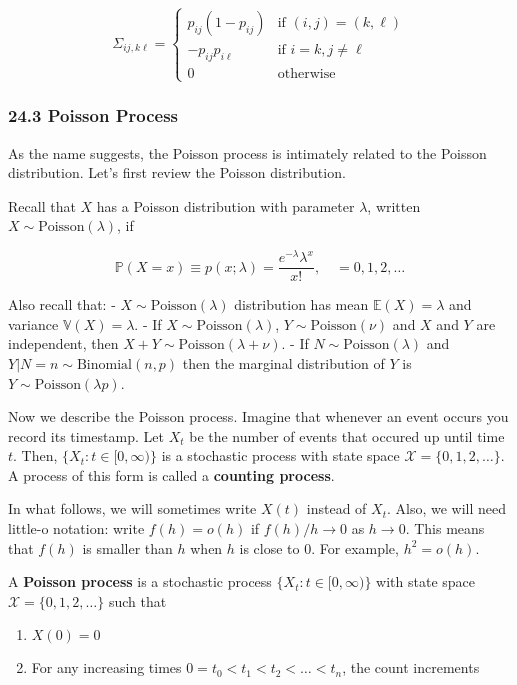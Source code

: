 \[ 
\Sigma_{ij, k\ell} = \begin{cases}
p_{ij}(1 - p_{ij}) &\text{if } (i, j) = (k, \ell) \\
-p_{ij} p_{i\ell} &\text{if } i = k, j \neq \ell \\
0 &\text{otherwise}
\end{cases}
\]

\subsubsection{24.3 Poisson Process}\label{poisson-process}

As the name suggests, the Poisson process is intimately related to the
Poisson distribution. Let's first review the Poisson distribution.

Recall that \(X\) has a Poisson distribution with parameter \(\lambda\),
written \(X \sim \text{Poisson}(\lambda)\), if

\[ \mathbb{P}(X = x) \equiv p(x; \lambda) = \frac{e^{-\lambda} \lambda^x}{x!}, \quad = 0, 1, 2, \dots \]

Also recall that: - \(X \sim \text{Poisson}(\lambda)\) distribution has
mean \(\mathbb{E}(X) = \lambda\) and variance
\(\mathbb{V}(X) = \lambda\). - If \(X \sim \text{Poisson}(\lambda)\),
\(Y \sim \text{Poisson}(\nu)\) and \(X\) and \(Y\) are independent, then
\(X + Y \sim \text{Poisson}(\lambda + \nu)\). - If
\(N \sim \text{Poisson}(\lambda)\) and
\(Y | N = n \sim \text{Binomial}(n, p)\) then the marginal distribution
of \(Y\) is \(Y \sim \text{Poisson}(\lambda p)\).

Now we describe the Poisson process. Imagine that whenever an event
occurs you record its timestamp. Let \(X_t\) be the number of events
that occured up until time \(t\). Then,
\(\{ X_t : t \in [0, \infty) \}\) is a stochastic process with state
space \(\mathcal{X} = \{ 0, 1, 2, \dots \}\). A process of this form is
called a \textbf{counting process}.

In what follows, we will sometimes write \(X(t)\) instead of \(X_t\).
Also, we will need little-o notation: write \(f(h) = o(h)\) if
\(f(h) / h \rightarrow 0\) as \(h \rightarrow 0\). This means that
\(f(h)\) is smaller than \(h\) when \(h\) is close to 0. For example,
\(h^2 = o(h)\).

A \textbf{Poisson process} is a stochastic process
\(\{ X_t : t \in [0, \infty) \}\) with state space
\(\mathcal{X} = \{ 0, 1, 2, \dots \}\) such that

\begin{enumerate}[tightlist,label={\arabic*.}]
\item
  \(X(0) = 0\)
\item
  For any increasing times \(0 = t_0 < t_1 < t_2 < \dots < t_n\), the
  count increments
\end{enumerate}

